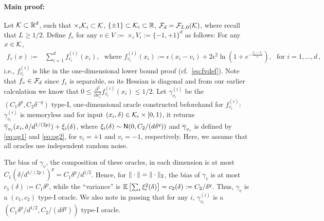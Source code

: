 \paragraph{Main proof:}
Let $\mathcal{K} \subset \mathbb{R}^d$, such that $\times_i \mathcal{K}_i \subset \mathcal{K}$, $\{\pm 1 \} \subset \mathcal{K}_i \subset \mathbb{R}$,
$\mathcal{F}_d = \mathcal{F}_{L,0}(\mathcal{K})$, where recall that $L\ge 1/2$.
Define $f_v$ for any $v\in V:=\times_i V_i := \{-1,+1\}^d$ as follows: For any $x \in \mathcal{K}$, 
\begin{align*}
  f_v(x) :=& \sum_{i=1}^d f^{(i)}_{v_i}(x_i), \,\,  \text{ where }
  f^{(i)}_{v_i}(x_i) := \epsilon\left( x_i-v_i\right)+2\epsilon^2 \ln\left(1+e^{-\frac{x_i-v_i}{\epsilon}}  \right),  \,\, \text{ for } i=1,\ldots,d\,,
\end{align*}
i.e., $f^{(i)}_{v_i}$ is like in the one-dimensional lower bound proof (cf.~\eqref{eq:fvdef}).
Note that $f_v \in \mathcal{F}_d$ since $f_v$ is separable, so its Hessian is diagonal and from our earlier calculation
we know that
$0\le \frac{\partial^2}{\partial x_i^2} f^{(i)}_{v_i}(x_i) \le 1/2$.
Let $\gamma^{(i)}_{v_i}$ be the  $(C_1 \delta^p,C_2 \delta^{-q})$ type-I, 
one-dimensional oracle constructed beforehand for $f^{(i)}_{v_i}$:
$\gamma^{(i)}_{v_i}$ is memoryless and for input $(x_i,\delta)\in \mathcal{K}_i \times [0,1)$, it returns
$\overline{\gamma}_{v_i}(x_i,\delta/d^{1/(2p)})+\xi_{i}(\delta)$, where $\xi_i(\delta) \sim \mathsf{N}(0, C_2/(d\delta^q))$ and
$\overline{\gamma}_{v_i}$ is defined by \eqref{eq:og1} and \eqref{eq:og2}, for $v_i=+1$ and $v_i=-1$, respectively.
Here, we assume that all oracles use independent random noise. 

The bias of $\gamma_v$, the composition of these oracles, in each dimension is at most
$C_1 (\delta/d^{1/(2p)})^p = C_1 \delta^p/d^{1/2}$. Hence, for $\|\cdot\| = \|\cdot\|_2$,
the bias of $\gamma_v$ is at most $c_1(\delta):=C_1 \delta^p$, while the ``variance'' is $\mathbb{E}\left[ \sum_i \xi_i^2(\delta) \right] = c_2(\delta):= C_2/\delta^q$. Thus, $\gamma_v$ is a $(c_1,c_2)$ type-I oracle.
We also note in passing that for any $i$, $\gamma^{(i)}_{v_i}$ is a $(C_1 \delta^p/d^{1/2},C_2/(d\delta^q))$ type-I oracle.


